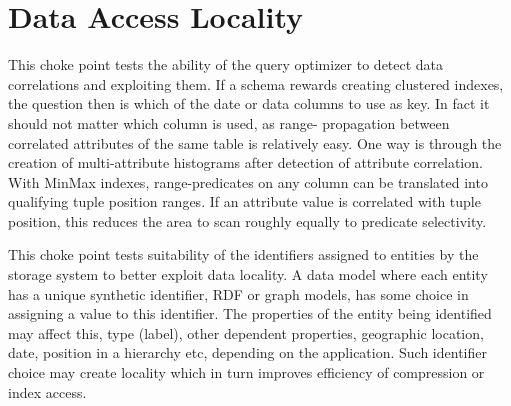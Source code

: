 
\section{Data Access Locality}



This choke point tests the ability of the query optimizer to detect data correlations and exploiting them. If a schema rewards creating clustered indexes, the question then is which of the date or data columns to use as key.
In fact it should not matter which column is used, as range- propagation between correlated attributes of the same table is relatively easy. One way is through the creation of multi-attribute histograms after detection of attribute correlation.
With MinMax indexes, range-predicates on any column can be translated into qualifying tuple position ranges. If an attribute value is correlated with tuple position, this reduces the area to scan roughly equally to predicate selectivity.





This choke point tests suitability of the identifiers assigned to entities by the storage system to better exploit data locality. A data model where each entity has a unique synthetic identifier,
\eg RDF or graph models, has some choice in assigning a value to this identifier.
The properties of the entity being identified may affect this, \eg type (label), other dependent properties,
\eg geographic location, date, position in a hierarchy etc, depending on the application. Such identifier choice may create locality which in turn improves efficiency of compression or index access.





